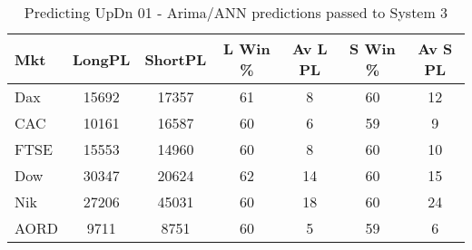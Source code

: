 \begin{table}[ht]
\centering
\caption[Predicting UpDn 01 - Arima/ANN predictions passed to System 3.]{Predicting UpDn 01 - Arima/ANN predictions passed to System 3} 
\label{tab:chp_ts:pUD_01_arima_ann_sys}
\begin{tabular}{lcccccc}
  \toprule Mkt & LongPL & ShortPL & L Win \% & Av L PL & S Win \% & Av S PL \\ 
  \midrule Dax & 15692 & 17357 & 61 & 8 & 60 & 12 \\ 
  CAC & 10161 & 16587 & 60 & 6 & 59 & 9 \\ 
  FTSE & 15553 & 14960 & 60 & 8 & 60 & 10 \\ 
  Dow & 30347 & 20624 & 62 & 14 & 60 & 15 \\ 
  Nik & 27206 & 45031 & 60 & 18 & 60 & 24 \\ 
  AORD & 9711 & 8751 & 60 & 5 & 59 & 6 \\ 
   \bottomrule \end{tabular}
\end{table}
